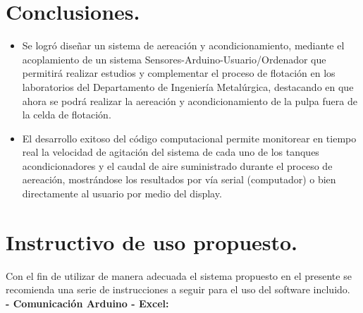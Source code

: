 \documentclass[11pt,letter
								]
								{article}
\begin{document}
		
	
\section{Conclusiones.}
\begin{itemize}
\item  Se  logró diseñar %
un sistema de aereación y acondicionamiento, mediante el acoplamiento de un sistema Sensores-Arduino-Usuario/Ordenador que permitirá realizar estudios y complementar  el proceso de flotación en los laboratorios del Departamento de Ingeniería Metalúrgica, destacando en que ahora se podrá  realizar la aereación y acondicionamiento de la pulpa fuera de la  celda de flotación.%


\item El desarrollo exitoso del código computacional  permite monitorear en tiempo real la velocidad de agitación del sistema de cada uno de los tanques acondicionadores y el caudal de aire suministrado  durante el proceso  de aereación, mostrándose los resultados por vía serial (computador) o bien directamente al usuario por medio del display.

\end{itemize}
	










\appendix
	
	\newpage



	\section{Instructivo de uso propuesto.}
Con el fin de utilizar de manera adecuada el sistema propuesto  en el presente se recomienda una serie de instrucciones a seguir para el uso del software incluido. \\
{\bfseries- Comunicación Arduino - Excel:}
\end{document}
